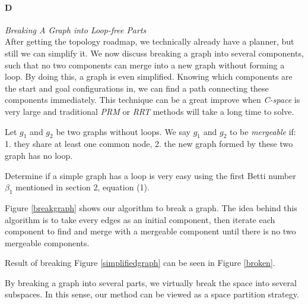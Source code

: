 \documentclass[11pt]{article}
\begin{document}
\paragraph{D} \emph{Breaking A Graph into Loop-free Parts} \hfill\\
\indent After getting the topology roadmap, we technically already have a planner, but still we can simplify it. We now discuss breaking a graph into several components, such that no two components can merge into a new graph without forming a loop. By doing this, a graph is even simplified. Knowing which components are the start and goal configurations in, we can find a path connecting these components immediately. This technique can be a great improve when \emph{C-space} is very large and traditional \emph{PRM} or \emph{RRT} methods will take a long time to solve.

\indent Let $g_1$ and $g_2$ be two graphs without loops. We say $g_1$ and $g_2$ to be \emph{mergeable} if: 1. they share at least one common node, 2. the new graph formed by these two graph has no loop. 

\indent Determine if a simple graph has a loop is very easy using the first Betti number $\beta_1$ mentioned in section 2, equation (1). 

\indent Figure \ref{breakgraph} shows our algorithm to break a graph. The idea behind this algorithm is to take every edges as an initial component, then iterate each component to find and merge with a mergeable component until there is no two mergeable components.

\indent Result of breaking Figure \ref{simplifiedgraph} can be seen in Figure \ref{broken}. 

\indent By breaking a graph into several parts, we virtually break the space into several subspaces. In this sense, our method can be viewed as a space partition strategy.
\end{document}
